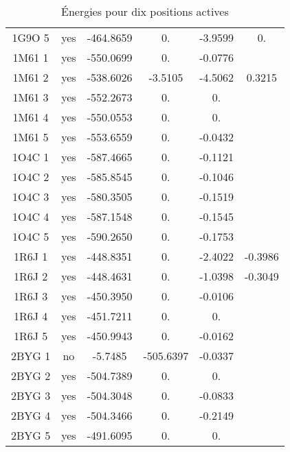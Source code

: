 \begin{table}[h]
\begin{minipage}[t]{.4\linewidth}
{\begin{tabular}{cccccc}
        1G9O 5 & yes & -464.8659 & 0. & -3.9599 & 0.\\
        1M61 1 & yes & -550.0699 & 0. & -0.0776 & \\
        1M61 2 & yes & -538.6026 & -3.5105 & -4.5062 & 0.3215 \\
        1M61 3 & yes & -552.2673 & 0. & 0. & \\
        1M61 4 & yes & -550.0553 & 0. & 0. & \\
        1M61 5 & yes & -553.6559 & 0. & -0.0432 & \\
        1O4C 1 & yes & -587.4665 & 0. & -0.1121 & \\
        1O4C 2 & yes & -585.8545 & 0. & -0.1046 & \\
        1O4C 3 & yes & -580.3505 & 0. & -0.1519 & \\
        1O4C 4 & yes & -587.1548 & 0. & -0.1545 & \\
        1O4C 5 & yes & -590.2650 & 0. & -0.1753 & \\
        1R6J 1 & yes & -448.8351 & 0. & -2.4022 & -0.3986 \\
        1R6J 2 & yes & -448.4631 & 0. & -1.0398 & -0.3049 \\
        1R6J 3 & yes & -450.3950 & 0. & -0.0106 & \\
        1R6J 4 & yes & -451.7211 & 0. & 0. & \\
        1R6J 5 & yes & -450.9943 & 0. & -0.0162 & \\
        2BYG 1 & no  & -5.7485   & -505.6397 & -0.0337 & \\
        2BYG 2 & yes & -504.7389 & 0. & 0. & \\
        2BYG 3 & yes & -504.3048 & 0. & -0.0833 & \\
        2BYG 4 & yes & -504.3466 & 0. & -0.2149 & \\
        2BYG 5 & yes & -491.6095 & 0. & 0. & \\
        
        \bottomrule


 \end{tabular}  
}    
 \caption{Énergies pour dix positions actives }
\label{tab:result_10_actives}
\end{minipage}
\hfill
\begin{minipage}[t]{.4\linewidth}
\end{minipage}
\end{table}
